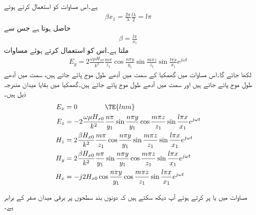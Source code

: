 ہے۔اس مساوات کو استعمال کرتے ہوئے
\begin{align*}
\beta x_1 = \frac{2\pi}{\lambda} \frac{l \lambda}{2}=l \pi
\end{align*}
حاصل ہوتا ہے جس سے
\begin{align}\label{مساوات_مویج_گھمکی_زاویائی_مستقل}
\beta=\frac{l \pi}{x_1}
\end{align}
ملتا ہے۔اس کو استعمال کرتے ہوئے مساوات  
\begin{align}\label{مساوات_مویج_گھمکی_برقی_ب}
E_y=2 \frac{\omega \mu H_{x0}}{k^2}\frac{m \pi}{z_1}\cos \frac{n\pi y}{y_1} \sin \frac{m \pi z}{z_1} \sin \frac{l \pi x}{x_1}  e^{j\omega t}
\end{align}
لکھا جائے گا۔اس مساوات میں گھمکیا کے  سمت میں  آدھے طول موج پائے جاتے ہیں،  سمت میں  آدھے طول موج پائے جاتے ہیں اور  سمت میں  آدھے طول موج پائے جاتے ہیں۔گھمکیا میں بقایا میدان مندرجہ ذیل ہیں۔
\begin{align}
E_x&=0 \quad \quad \quad \quad \TE{lnm} \\
E_z&=-2 \frac{\omega \mu H_{x0}}{k^2}\frac{n \pi}{y_1}\sin \frac{n\pi y}{y_1} \cos \frac{m \pi z}{z_1} \sin \frac{l \pi x}{x_1}  e^{j\omega t}\label{مساوات_مویج_دوسرا_برقی_جزو}\\
H_z&=2 \frac{\beta   H_{x0}}{k^2}\frac{m \pi}{z_1}\cos \frac{n\pi y}{y_1} \sin \frac{m \pi z}{z_1} \sin \frac{l \pi x}{x_1}  e^{j\omega t}\label{مساوات_مویج_مقناطیسی_جزو_پ}\\
H_y&=2 \frac{\beta  H_{x0}}{k^2}\frac{n \pi}{y_1}\sin \frac{n\pi y}{y_1} \cos \frac{m \pi z}{z_1} \sin \frac{l \pi x}{x_1}  e^{j\omega t}\label{مساوات_مویج_مقناطیسی_جزو_ب}\\
H_x&=-j 2 H_{x0} \cos \frac{n\pi y}{y_1} \cos \frac{m \pi  z}{z_1} \sin \frac{l \pi x}{x_1} e^{j \omega t} \label{مساوات_مویج_مقناطیسی_جزو_الف}
\end{align}

مساوات  میں  یا  پر کرتے ہوئے آپ دیکھ سکتے ہیں کہ دونوں بند سطحوں پر برقی میدان صفر کے برابر ہے۔

